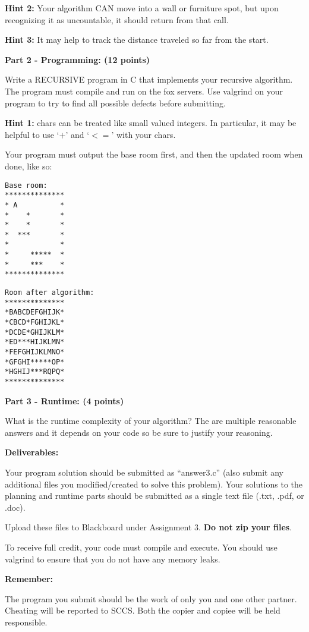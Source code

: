 \documentclass[12pt]{elsart}
\begin{document}
{\bf Hint 2:} Your algorithm CAN move into a wall or furniture spot, but upon recognizing it as uncountable, it should return from that call.

{\bf Hint 3:} It may help to track the distance traveled so far from the start. 

\vfill


{\bf Part 2 - Programming: (12 points)}

Write a RECURSIVE program in C that implements your recursive algorithm. The program must compile and run on the fox servers. Use valgrind on your program to try to find all possible defects before submitting.

{\bf Hint 1:} chars can be treated like small valued integers.  In particular, it may be helpful to use `$+$' and `$<=$' with your chars.

Your program must output the base room first, and then the updated room when done, like so:

\begin{minipage}[t]{0.5\textwidth}
{\small
\begin{verbatim}
Base room:
**************
* A          *
*    *       *
*    *       *
*  ***       *
*            *
*     *****  *
*     ***    *
**************
\end{verbatim}
}
\end{minipage}
\begin{minipage}[t]{0.5\textwidth}
{\small
\begin{verbatim}
Room after algorithm:
**************
*BABCDEFGHIJK*
*CBCD*FGHIJKL*
*DCDE*GHIJKLM*
*ED***HIJKLMN*
*FEFGHIJKLMNO*
*GFGHI*****OP*
*HGHIJ***RQPQ*
**************
\end{verbatim}
}
\end{minipage}

\vfill


{\bf Part 3 - Runtime: (4 points)}

What is the runtime complexity of your algorithm?  The are multiple reasonable answers and it depends on your code so be sure to justify your reasoning.

\newpage

{\bf Deliverables:}

Your program solution should be submitted as ``answer3.c'' (also submit any additional files you modified/created to solve this problem).  Your solutions to the planning and runtime parts should be submitted as a single text file (.txt, .pdf, or .doc).

Upload these files to Blackboard under Assignment 3.  {\bf Do not zip your files}. 

To receive full credit, your code must compile and execute. You should use valgrind to
ensure that you do not have any memory leaks.

{\bf Remember:  

The program you submit should be the work of only you and one other partner. Cheating will be reported to SCCS. Both the copier and copiee will be held responsible.}
\end{document}
